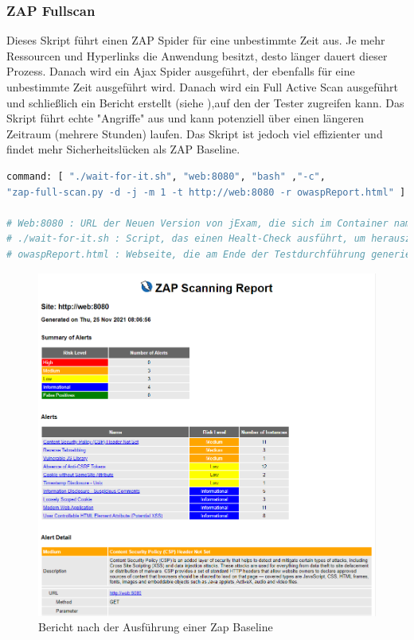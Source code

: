 \subsubsection{ZAP Fullscan}


Dieses Skript führt einen ZAP Spider für eine unbestimmte Zeit aus.
Je mehr Ressourcen und Hyperlinks die Anwendung besitzt, desto länger
dauert dieser Prozess. Danach wird ein Ajax Spider ausgeführt, der
ebenfalls für eine unbestimmte Zeit ausgeführt wird. Danach wird ein
Full Active Scan ausgeführt und schließlich ein Bericht erstellt
(siehe ),auf  den der Tester zugreifen kann.
Das Skript führt echte "Angriffe" aus  und kann potenziell über einen
längeren Zeitraum (mehrere Stunden) laufen. Das Skript ist jedoch viel
effizienter und findet mehr  Sicherheitslücken als ZAP Baseline.

\begin{lstlisting}[language=Dockerfile,label={lst:fullscan},caption={ZAP Baseline Script}]
command: [ "./wait-for-it.sh", "web:8080", "bash" ,"-c",
"zap-full-scan.py -d -j -m 1 -t http://web:8080 -r owaspReport.html" ]

# Web:8080 : URL der Neuen Version von jExam, die sich im Container namens Web befindet
# ./wait-for-it.sh : Script, das einen Healt-Check ausführt, um herauszufinden, ob die parametrisierte Anwendung (In diesem Fall Web:8080) bereits gestartet ist.
# owaspReport.html : Webseite, die am Ende der Testdurchführung generiert wird
\end{lstlisting}


\begin{figure}[H]
    \centering
    \includegraphics[scale=0.5]{images/zap-report}
    \caption{Bericht nach der Ausführung einer Zap Baseline} \label{fig:baseline}
\end{figure}
